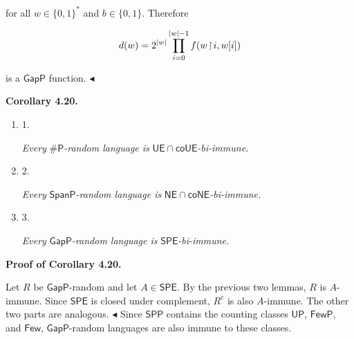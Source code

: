 \documentclass[10pt,a4paper]{article}
\begin{document}
for all $w\in\{0,1\}^{*}$ and $b\in\{0,1\}$. Therefore\par


\[\begin{gathered}
d(w)=2^{|w|}\prod_{i=0}^{|w|-1}f(w\negthinspace\upharpoonright\negthinspace i,w[i])
\end{gathered}\]


is a $\mathsf{GapP}$ function.
$\blacktriangleleft$\par





\par\medskip\noindent\textbf{
\textbf{Corollary 4.20}\textbf{.}
}\par



\begin{enumerate}


\item[] 
1. 


\emph{Every }${\mathsf{\#}\mathsf{P}}$\emph{-random language is }$\mathsf{UE}\cap\mathsf{co}\mathsf{UE}$\emph{-bi-immune.}\par





\item[] 
2. 


\emph{Every }$\mathsf{SpanP}$\emph{-random language is }$\mathsf{NE}\cap\mathsf{co}\mathsf{NE}$\emph{-bi-immune.}\par





\item[] 
3. 


\emph{Every }$\mathsf{GapP}$\emph{-random language is }$\mathsf{SPE}$\emph{-bi-immune.}\par





\end{enumerate}







\par\medskip\noindent\textbf{Proof of Corollary 4.20.}\par




Let $R$ be $\mathsf{GapP}$-random and let $A\in\mathsf{SPE}$. By the previous two lemmas, $R$ is $A$-immune. Since $\mathsf{SPE}$ is closed under complement, $R^{c}$ is also $A$-immune. The other two parts are analogous.
$\blacktriangleleft$
Since $\mathsf{SPP}$ contains the counting classes $\mathsf{UP}$, $\mathsf{FewP}$, and $\mathsf{Few}$, $\mathsf{GapP}$-random languages are also immune to these classes.\par
\end{document}
